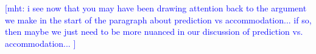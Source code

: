 \documentclass[doc]{apa6}
\newcommand{\mht}[1]{\textcolor{Blue}{[mht: #1]}}
\begin{document}
\mht{i see now that you may have been drawing attention back to the argument we make in the start of the paragraph about prediction vs accommodation... if so, then maybe we just need to be more nuanced in our discussion of prediction vs. accommodation... }



\end{document}
